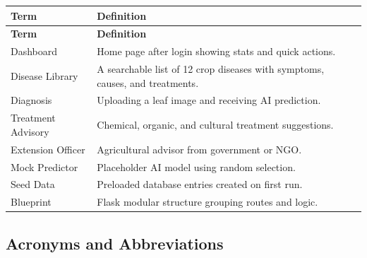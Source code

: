 \documentclass[12pt,a4paper]{article}
\begin{document}
\begin{longtable}{|p{3.5cm}|p{10.5cm}|}
\hline
\rowcolor{lightgreen}
\textbf{Term} & \textbf{Definition} \\
\hline
\endfirsthead
\hline
\rowcolor{lightgreen}
\textbf{Term} & \textbf{Definition} \\
\hline
\endhead

Dashboard & Home page after login showing stats and quick actions. \\
\hline
Disease Library & A searchable list of 12 crop diseases with symptoms, causes, and treatments. \\
\hline
Diagnosis & Uploading a leaf image and receiving AI prediction. \\
\hline
Treatment Advisory & Chemical, organic, and cultural treatment suggestions. \\
\hline
Extension Officer & Agricultural advisor from government or NGO. \\
\hline
Mock Predictor & Placeholder AI model using random selection. \\
\hline
Seed Data & Preloaded database entries created on first run. \\
\hline
Blueprint & Flask modular structure grouping routes and logic. \\
\hline

\end{longtable}


\subsection{Acronyms and Abbreviations}
\end{document}

